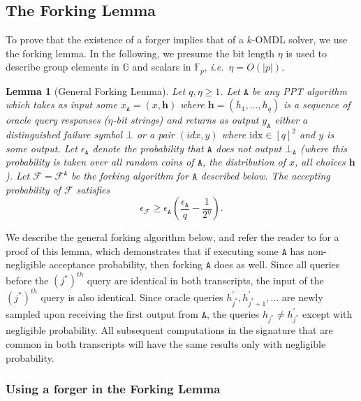 \documentclass{mrl}
\theoremstyle{plain}
\newtheorem{lemma}{Lemma}[section]
\theoremstyle{definition}
\begin{document}
\subsection{The Forking Lemma}
To prove that the existence of a forger implies that of a $k$-OMDL solver, we use the forking lemma. In the following, we presume the bit length $\eta$ is used to describe group elements in $\mathbb{G}$ and scalars in $\mathbb{F}_p$, \textit{i.e.}\ $\eta = O(\left|p\right|)$.

\begin{lemma}[General Forking Lemma]\label{lem:fork}
Let $q, \eta \geq 1$. Let $\texttt{A}$ be any PPT algorithm which takes as input some $x_\texttt{A} = (x, \textbf{h})$ where $\textbf{h} = (h_1, \ldots, h_q)$ is a sequence of oracle query responses ($\eta$-bit strings) and returns as output $y_{\texttt{A}}$ either a distinguished failure symbol $\bot$ or a pair $(\textit{idx}, y)$ where $\text{idx} \in [q]^2$ and $y$ is some output. Let $\epsilon_{\texttt{A}}$ denote the probability that $\texttt{A}$ does not output $\bot_{\texttt{A}}$ (where this probability is taken over all random coins of $\texttt{A}$, the distribution of $x$, all choices $\textbf{h}$). Let $\mathcal{F} = \mathcal{F}^{\texttt{A}}$ be the forking algorithm for $\texttt{A}$ described below. The accepting probability of $\mathcal{F}$ satisfies \[\epsilon_{\mathcal{F}} \geq \epsilon_{\texttt{A}} \left(\frac{\epsilon_{\texttt{A}}}{q} - \frac{1}{2^\eta}\right).\]
\end{lemma}

We describe the general forking algorithm below, and refer the reader to \cite{bellare} for a proof of this lemma, which demonstrates that if executing some $\texttt{A}$ has non-negligible acceptance probability, then forking $\texttt{A}$ does as well. Since all queries before the $(j^*)^{th}$ query are identical in both transcripts, the input of the $(j^*)^{th}$ query is also identical. Since oracle queries $h_{j^*}^{\prime}, h_{j^*+1}^{\prime}, \ldots$ are newly sampled upon receiving the first output from $\texttt{A}$, the queries $h_{j^*} \neq h_{j^*}^\prime$ except with negligible probability. All subsequent computations in the signature that are common in both transcripts will have the same results only with negligible probability. 


\subsubsection{Using a forger in the Forking Lemma}\label{subsubsec:using-forger}
\end{document}
